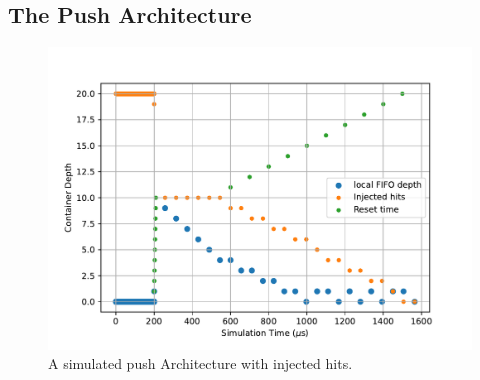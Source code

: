 \subsection{The Push Architecture}

\begin{figure}[]
\centering
\includegraphics[width=\textwidth]{images/push_arch_buff.pdf}
\caption{A simulated push Architecture with injected hits.}
\end{figure}~\label{fig:push_arch_verification}
